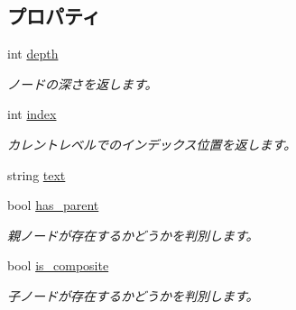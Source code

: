 \subsection*{プロパティ}
\begin{DoxyCompactItemize}
\item 
int \hyperlink{interfacelazurite_1_1attitude_1_1_i_file_node_a8904c51913b26cf0299ab565a1226b95}{depth}
\begin{DoxyCompactList}\small\item\em ノードの深さを返します。 \item\end{DoxyCompactList}\item 
int \hyperlink{interfacelazurite_1_1attitude_1_1_i_file_node_a12c90a434a3bbbc7aa33998855d267d1}{index}
\begin{DoxyCompactList}\small\item\em カレントレベルでのインデックス位置を返します。 \item\end{DoxyCompactList}\item 
string \hyperlink{interfacelazurite_1_1attitude_1_1_i_file_node_a7ac4b8574f1527248a33d0e816e080cf}{text}
\item 
bool \hyperlink{interfacelazurite_1_1attitude_1_1_i_file_node_a564ece8cd8b85bc04bfe7fbe9d9ac0ba}{has\_\-parent}
\begin{DoxyCompactList}\small\item\em 親ノードが存在するかどうかを判別します。 \item\end{DoxyCompactList}\item 
bool \hyperlink{interfacelazurite_1_1attitude_1_1_i_file_node_aef59ad71eae714defca2dc6fb7a03435}{is\_\-composite}
\begin{DoxyCompactList}\small\item\em 子ノードが存在するかどうかを判別します。 \item\end{DoxyCompactList}\end{DoxyCompactItemize}


